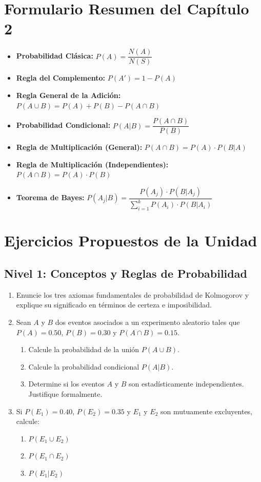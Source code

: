 \section{Formulario Resumen del Capítulo 2}
\begin{formulario}
\begin{itemize}
    \item \textbf{Probabilidad Clásica:} $P(A) = \dfrac{N(A)}{N(S)}$
    \item \textbf{Regla del Complemento:} $P(A') = 1 - P(A)$
    \item \textbf{Regla General de la Adición:} $P(A \cup B) = P(A) + P(B) - P(A \cap B)$
    \item \textbf{Probabilidad Condicional:} $P(A|B) = \dfrac{P(A \cap B)}{P(B)}$
    \item \textbf{Regla de Multiplicación (General):} $P(A \cap B) = P(A) \cdot P(B|A)$
    \item \textbf{Regla de Multiplicación (Independientes):} $P(A \cap B) = P(A) \cdot P(B)$
    \item \textbf{Teorema de Bayes:} $P(A_j|B) = \dfrac{P(A_j) \cdot P(B|A_j)}{\sum_{i=1}^k P(A_i) \cdot P(B|A_i)}$
\end{itemize}
\end{formulario}

\section{Ejercicios Propuestos de la Unidad}

\subsection*{Nivel 1: Conceptos y Reglas de Probabilidad}
\begin{enumerate}
    \item Enuncie los tres axiomas fundamentales de probabilidad de Kolmogorov y explique su significado en términos de certeza e imposibilidad.
    \item Sean $A$ y $B$ dos eventos asociados a un experimento aleatorio tales que $P(A) = 0.50$, $P(B) = 0.30$ y $P(A \cap B) = 0.15$.
    \begin{enumerate}[label=\alph*)]
        \item Calcule la probabilidad de la unión $P(A \cup B)$.
        \item Calcule la probabilidad condicional $P(A|B)$.
        \item Determine si los eventos $A$ y $B$ son estadísticamente independientes. Justifique formalmente.
    \end{enumerate}
    \item Si $P(E_1) = 0.40$, $P(E_2) = 0.35$ y $E_1$ y $E_2$ son mutuamente excluyentes, calcule:
    \begin{enumerate}[label=\alph*)]
        \item $P(E_1 \cup E_2)$
        \item $P(E_1 \cap E_2)$
        \item $P(E_1|E_2)$
    \end{enumerate}
\end{enumerate}

